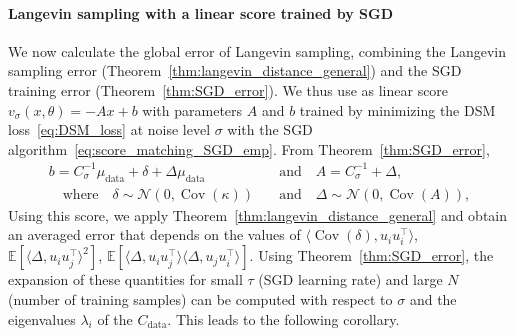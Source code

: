 \documentclass[11pt]{article}
\newcommand{\cov}{\operatorname{Cov}}
\begin{document}
\paragraph{Langevin sampling with a linear score trained by SGD} We now calculate the global error of Langevin sampling, combining the Langevin sampling error (Theorem~\ref{thm:langevin_distance_general}) and the SGD training error  (Theorem~\ref{thm:SGD_error}). We thus use as linear score $v_\sigma(x, \theta) = -A x + b$
with parameters \( A \) and \( b \) trained by minimizing the DSM loss~\eqref{eq:DSM_loss} at noise level \( \sigma \) with the SGD algorithm~\eqref{eq:score_matching_SGD_emp}. From Theorem~\ref{thm:SGD_error}, 
\begin{equation*}
\begin{split}
    b = C_\sigma^{-1}\mu_\mathrm{data} + \delta + \Delta \mu_\mathrm{data} \quad &\text{and} \quad
    A = C_\sigma^{-1} + \Delta, \\ 
    \quad\text{where}\quad \delta \sim \mathcal{N}(0, \cov(\kappa)) \quad &\text{and}\quad \Delta \sim \mathcal{N}(0, \cov(A)),
\end{split}
\end{equation*}
Using this score, we apply Theorem~\ref{thm:langevin_distance_general} and obtain an averaged error that depends on the values of $\langle \cov(\delta), u_i u_i^\top \rangle$, $\mathbb{E}[\langle \Delta, u_i u_j^\top \rangle^2]$,  $\mathbb{E}[\langle \Delta, u_i u_j^\top \rangle \langle \Delta, u_j u_i^\top \rangle]$. Using Theorem~\ref{thm:SGD_error}, the expansion of these quantities for small \( \tau \) (SGD learning rate) and large $N$ (number of training samples) can be computed with respect to $\sigma$ and the eigenvalues $\lambda_i$ of the $C_\mathrm{data}$.  This leads to the following corollary. %
\end{document}
